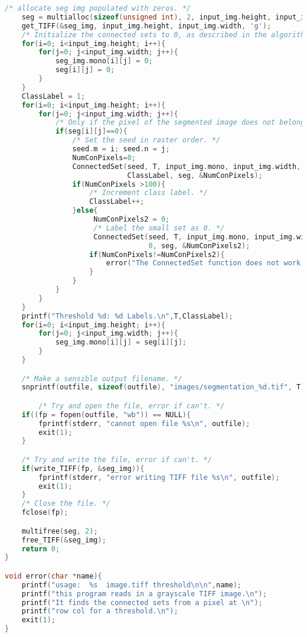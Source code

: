 \documentclass{article}
\begin{document}
\begin{lstlisting}[language=C, caption=sec\_2.c, label={lst:sec2}]
    /* allocate seg img populated with zeros. */
    seg = multialloc(sizeof(unsigned int), 2, input_img.height, input_img.width);
    get_TIFF(&seg_img, input_img.height, input_img.width, 'g');
    /* Initialize the connected sets to 0, as described in the algorithm */
    for(i=0; i<input_img.height; i++){
        for(j=0; j<input_img.width; j++){
            seg_img.mono[i][j] = 0;
            seg[i][j] = 0;
        }
    }
    ClassLabel = 1;
    for(i=0; i<input_img.height; i++){
        for(j=0; j<input_img.width; j++){
            /* Only if the pixel of the segmented image does not belong to a connected set */
            if(seg[i][j]==0){
                /* Set the seed in raster order. */
                seed.m = i; seed.n = j;
                NumConPixels=0;
                ConnectedSet(seed, T, input_img.mono, input_img.width, input_img.height,
                             ClassLabel, seg, &NumConPixels);
                if(NumConPixels >100){
                    /* Increment class label. */
                    ClassLabel++;
                }else{
                     NumConPixels2 = 0;
                     /* Label the small set as 0. */
                     ConnectedSet(seed, T, input_img.mono, input_img.width, input_img.height,
                                  0, seg, &NumConPixels2);
                    if(NumConPixels!=NumConPixels2){
                        error("The ConnectedSet function does not work.");
                    }
                }
            }
        }
    }
    printf("Threshold %d: %d Labels.\n",T,ClassLabel);
    for(i=0; i<input_img.height; i++){
        for(j=0; j<input_img.width; j++){
            seg_img.mono[i][j] = seg[i][j];
        }
    }

    /* Make a sensible output filename. */
    snprintf(outfile, sizeof(outfile), "images/segmentation_%d.tif", T);

        /* Try and open the file, error if can't. */
    if((fp = fopen(outfile, "wb")) == NULL){
        fprintf(stderr, "cannot open file %s\n", outfile);
        exit(1);
    }

    /* Try and write the file, error if can't. */
    if(write_TIFF(fp, &seg_img)){
        fprintf(stderr, "error writing TIFF file %s\n", outfile);
        exit(1);
    }
    /* Close the file. */
    fclose(fp);

    multifree(seg, 2);
    free_TIFF(&seg_img);
    return 0;
}

void error(char *name){
    printf("usage:  %s  image.tiff threshold\n\n",name);
    printf("this program reads in a grayscale TIFF image.\n");
    printf("It finds the connected sets from a pixel at \n");
    printf("row col for a threshold.\n");
    exit(1);
}

\end{lstlisting}
\end{document}
